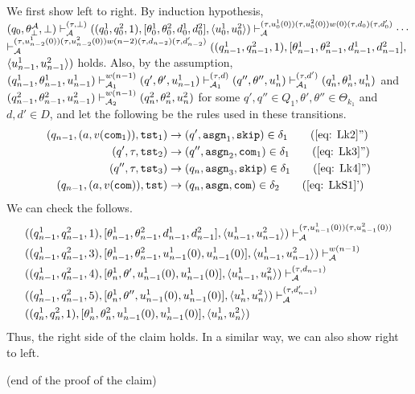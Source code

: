 We first show left to right.
By induction hypothesis,
$(q_0, \theta^{\cal A}_\bot, \bot)
\vdash_{\cal A}^{(\tau,\bot)}
((q^1_0,q^2_0,1),[\theta^1_0,\theta^2_0,d^1_0,d^2_0],\langle u^1_0,u^2_0\rangle)
\vdash_{\cal A}^{(\tau,u^1_0(0))(\tau,u^2_0(0))w(0)(\tau,d_0)(\tau,d'_0)}
\cdots$
\\
$\vdash_{\cal A}^{(\tau,u^1_{n-2}(0))(\tau,u^2_{n-2}(0))w(n-2)(\tau,d_{n-2})(\tau,d'_{n-2})}
((q^1_{n-1},q^2_{n-1},1),[\theta^1_{n-1},\theta^2_{n-1},d^1_{n-1},d^2_{n-1}],$
\\
$\langle u^1_{n-1},u^2_{n-1}\rangle)$
holds.
Also, by the assumption,
$(q^1_{n-1},\theta^1_{n-1},u^1_{n-1})
\vdash_{{\cal A}_1}^{w(n-1)}
(q',\theta',u^1_{n-1})
\vdash_{{\cal A}_1}^{(\tau,d)}
(q'',\theta'',u^1_n)
\vdash_{{\cal A}_1}^{(\tau,d')}
(q^1_n,\theta^1_n,u^1_n)$
and
$(q^2_{n-1},\theta^2_{n-1},u^2_{n-1})
\vdash_{{\cal A}_2}^{w(n-1)}
(q^2_n,\theta^2_n,u^2_n)$
for some $q',q''\in Q_1, \theta',\theta''\in\Theta_{k_1}$ and
$d,d'\in D$,
and let the following be the rules used in these transitions.
\begin{align}
(q_{n-1}, (a,v(\com_1)), \tst_1) &\to(q',\asgn_1, \skip)\in\delta_1 \tag{\ref{eq: Lk2}''}\\
(q', \tau, \tst_2) &\to(q'',\asgn_2, \com_1)\in\delta_1 \tag{\ref{eq: Lk3}''}\\
(q'', \tau, \tst_3) &\to(q_{n},\asgn_3, \skip)\in\delta_1 \tag{\ref{eq: Lk4}''}\\
(q_{n-1}, (a,v(\com)), \tst) &\to(q_{n},\asgn, \com)\in\delta_2 \tag{\ref{eq: LkS1}'}
\end{align}
We can check the follows.
\begin{align*}
&((q^1_{n-1},q^2_{n-1},1),[\theta^1_{n-1},\theta^2_{n-1},d^1_{n-1},d^2_{n-1}],\langle u^1_{n-1},u^2_{n-1}\rangle)
\vdash_{\cal A}^{(\tau,u^1_{n-1}(0))(\tau,u^2_{n-1}(0))}\\
&((q^1_{n-1},q^2_{n-1},3),[\theta^1_{n-1},\theta^2_{n-1},u^1_{n-1}(0),u^1_{n-1}(0)],\langle u^1_{n-1},u^2_{n-1}\rangle)
\vdash_{\cal A}^{w(n-1)}\\
&((q^1_{n-1},q^2_{n-1},4),[\theta^1_{n},\theta',u^1_{n-1}(0),u^1_{n-1}(0)],\langle u^1_{n-1},u^2_{n}\rangle)
\vdash_{\cal A}^{(\tau,d_{n-1})}\\
&((q^1_{n-1},q^2_{n-1},5),[\theta^1_{n},\theta'',u^1_{n-1}(0),u^1_{n-1}(0)],\langle u^1_{n},u^2_{n}\rangle)
\vdash_{\cal A}^{(\tau,d'_{n-1})}\\
&((q^1_{n},q^2_{n},1),[\theta^1_{n},\theta^2_{n},u^1_{n-1}(0),u^1_{n-1}(0)],\langle u^1_{n},u^2_{n}\rangle)
\end{align*}
Thus, the right side of the claim holds.
In a similar way, we can also show right to left.
\begin{flushright}
(end of the proof of the claim)
\end{flushright}
